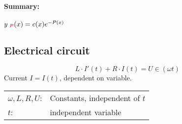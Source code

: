 \documentclass[]{article}
\begin{document}
\paragraph{Summary:} $y_ \text{ \textcolor{red}{$P$}}(x)=c(x) e ^{-P(x)}$
\subsection{Electrical circuit}
\begin{equation}
L \cdot I'(t)+R \cdot I(t)=U\in(\omega t)
\end{equation}
Current $I=I(t)$, dependent on variable.\\
\begin{tabular}{@{}l l}
	$\omega,L,R,U$: & Constants, independent of $t$\\
	$t$: & independent variable
\end{tabular}
\end{document}
